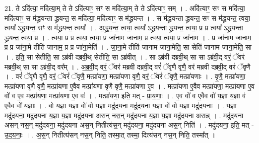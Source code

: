 \documentclass[17pt]{extarticle}
\begin{document}
21. ते ऽदि॑त्या॒ मदि॑त्या॒म् ते ते ऽदि॑त्याꣳ॒॒ सꣳ स मदि॑त्या॒म् ते ते ऽदि॑त्याꣳ॒॒ सम् । . अदि॑त्याꣳ॒॒ सꣳ स मदि॑त्या॒ मदि॑त्याꣳ॒॒ स म॑द्ध्रयन्ता द्ध्रयन्त॒ स मदि॑त्या॒ मदि॑त्याꣳ॒॒ स म॑द्ध्रयन्त । . स म॑द्ध्रयन्ता द्ध्रयन्त॒ सꣳ स म॑द्ध्रयन्त॒ त्वया॒ त्वया᳚ ऽद्ध्रयन्त॒ सꣳ स म॑द्ध्रयन्त॒ त्वया᳚ । . अ॒द्ध्र॒य॒न्त॒ त्वया॒ त्वया᳚ ऽद्ध्रयन्ता द्ध्रयन्त॒ त्वया॒ प्र प्र त्वया᳚ ऽद्ध्रयन्ता द्ध्रयन्त॒ त्वया॒ प्र । . त्वया॒ प्र प्र त्वया॒ त्वया॒ प्र जा॑नाम जानाम॒ प्र त्वया॒ त्वया॒ प्र जा॑नाम । . प्र जा॑नाम जानाम॒ प्र प्र जा॑ना॒मे तीति॑ जानाम॒ प्र प्र जा॑ना॒मेति॑ । . जा॒ना॒मे तीति॑ जानाम जाना॒मेति॒ सा सेति॑ जानाम जाना॒मेति॒ सा । . इति॒ सा सेतीति॒ सा ऽब्र॑वी दब्रवी॒थ् सेतीति॒ सा ऽब्र॑वीत् । . सा ऽब्र॑वी दब्रवी॒थ् सा सा ऽब्र॑वी॒द् वरं॒ ॅवर॑ मब्रवी॒थ् सा सा ऽब्र॑वी॒द् वर᳚म् । . अ॒ब्र॒वी॒द् वरं॒ ॅवर॑ मब्रवी दब्रवी॒द् वरं॑ ॅवृणै वृणै॒ वर॑ मब्रवी दब्रवी॒द् वरं॑ ॅवृणै । . वरं॑ ॅवृणै वृणै॒ वरं॒ ॅवरं॑ ॅवृणै॒ मत्प्रा॑यणा॒ मत्प्रा॑यणा वृणै॒ वरं॒ ॅवरं॑ ॅवृणै॒ मत्प्रा॑यणाः । . वृ॒णै॒ मत्प्रा॑यणा॒ मत्प्रा॑यणा वृणै वृणै॒ मत्प्रा॑यणा ए॒वैव मत्प्रा॑यणा वृणै वृणै॒ मत्प्रा॑यणा ए॒व । . मत्प्रा॑यणा ए॒वैव मत्प्रा॑यणा॒ मत्प्रा॑यणा ए॒व वो॑ व ए॒व मत्प्रा॑यणा॒ मत्प्रा॑यणा ए॒व वः॑ । . मत्प्रा॑यणा॒ इति॒ मत् - प्रा॒य॒णाः॒ । . ए॒व वो॑ व ए॒वैव वो॑ य॒ज्ञा य॒ज्ञा व॑ ए॒वैव वो॑ य॒ज्ञाः । . वो॒ य॒ज्ञा य॒ज्ञा वो॑ वो य॒ज्ञा मदु॑दयना॒ मदु॑दयना य॒ज्ञा वो॑ वो य॒ज्ञा मदु॑दयनाः । . य॒ज्ञा मदु॑दयना॒ मदु॑दयना य॒ज्ञा य॒ज्ञा मदु॑दयना असन् नस॒न् मदु॑दयना य॒ज्ञा य॒ज्ञा मदु॑दयना असन्न् । . मदु॑दयना असन् नस॒न् मदु॑दयना॒ मदु॑दयना अस॒न् नितीत्य॑स॒न् मदु॑दयना॒ मदु॑दयना अस॒न् निति॑ । . मदु॑दयना॒ इति॒ मत् - उ॒द॒य॒नाः॒ । . अ॒स॒न् नितीत्य॑सन् नस॒न् निति॒ तस्मा॒त् तस्मा॒ दित्य॑सन् नस॒न् निति॒ तस्मा᳚त् । \newline
\end{document}
